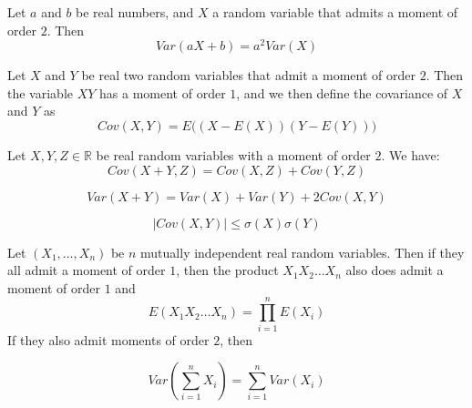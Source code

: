 \documentclass[
10pt, %
a4paper, %
oneside, %
headinclude,footinclude, %
BCOR5mm, %
]{scrartcl}
\begin{document}
\begin{proposition}
    \label{prop:var}

    Let $a$ and $b$ be real numbers, and $X$ a random variable that admits a moment of order $2$. Then
    \begin{equation*}
	Var(aX+b)=a^2Var(X)
    \end{equation*}

\end{proposition}

\begin{proposition}
    Let $X$ and $Y$ be real two random variables that admit a moment of order $2$. Then the variable $XY$ has a moment of order $1$, and we then define the covariance of $X$ and $Y$ as
    \begin{equation*}
	Cov(X,Y) = E\big( (X-E(X))(Y-E(Y))\big)
    \end{equation*}
\end{proposition}
    

\begin{lemma}
    Let $X, Y, Z\in \mathbb{R} $ be real random variables with a moment of order $2$. We have:
\begin{equation*}
    Cov(X+Y, Z) = Cov(X,Z)+Cov(Y,Z)
\end{equation*}

\begin{equation*}
    Var(X+Y) = Var(X)+Var(Y)+2Cov(X,Y)
\end{equation*}

\begin{equation*}
    |Cov(X,Y)|\leq \sigma(X)\sigma(Y)
\end{equation*}
\end{lemma}

\begin{proposition}
    Let $(X_1, \dots, X_n)$ be $n$ mutually independent real random variables. Then if they all admit a moment of order $1$, then the product $X_1X_2\dots X_n$ also does admit a moment of order $1$ and 
    \begin{equation*}
	E(X_1X_2\dots X_n) = \prod^{n}_{i=1} E(X_i)
    \end{equation*}
    If they also admit moments of order $2$, then
    
    \begin{equation*}
	Var( \sum^{n}_{i=1} X_i ) = \sum^{n}_{i=1} Var(X_i)
    \end{equation*}
\end{proposition}
\end{document}
